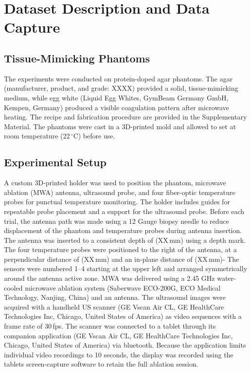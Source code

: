 \section{Dataset Description and Data Capture}
\label{sec:data_capture}

\subsection{Tissue-Mimicking Phantoms}
The experiments were conducted on protein-doped agar phantoms.
The agar (manufacturer, product, and grade: XXXX) provided a solid, tissue-mimicking
medium, while egg white (Liquid Egg Whites, GymBeam Germany GmbH, Kempen, Germany) produced
a visible coagulation pattern after microwave heating. 
The recipe and fabrication procedure are provided in the Supplementary Material. 
The phantoms were cast in a 3D-printed mold and allowed to set at room temperature (22\,$^\circ$C) before use.

\subsection{Experimental Setup}
A custom 3D-printed holder was used to position the phantom, microwave ablation
(MWA) antenna, ultrasound probe, and four fiber-optic temperature probes for punctual temperature monitoring.
The
holder includes guides for repeatable probe placement and a support for the
ultrasound probe. Before each trial, the antenna path was made using a 12 Gauge biopsy
needle to reduce displacement of the phantom and temperature probes during antenna insertion. 
The antenna was inserted to a consistent depth of (XX\,mm) using a depth mark. The four
temperature probes were positioned to the right of the antenna, at a
perpendicular distance of (XX\,mm) and an in-plane distance of (XX\,mm)-
The sensors were numbered 1–4 starting at the upper left and arranged symmetrically around the antenna active zone.
MWA was delivered using a 2.45 GHz water-cooled microwave ablation system (Saberwave ECO-200G, ECO Medical Technology, Nanjing, China) and an antenna.
The ultrasound images were acquired with a handheld US scanner (GE Vscan Air CL, GE HealthCare Technologies Inc, Chicago, United States of America) as video sequences with a frame rate of 30\,fps.
The scanner was connected to a tablet through its companion application (GE Vscan Air CL, GE HealthCare Technologies Inc, Chicago, United States of America) via bluetooth.
Because the application limits individual video recordings to 10 seconds, the display was recorded using the tablets screen-capture software to retain the full ablation session.
 
